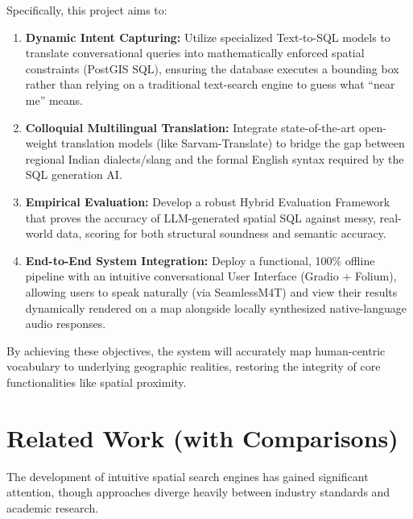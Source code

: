 \documentclass[11pt,a4paper]{article}
\begin{document}
Specifically, this project aims to:
\begin{enumerate}
    \item \textbf{Dynamic Intent Capturing:} Utilize specialized Text-to-SQL models to translate conversational queries into mathematically enforced spatial constraints (PostGIS SQL), ensuring the database executes a bounding box rather than relying on a traditional text-search engine to guess what ``near me'' means.
    \item \textbf{Colloquial Multilingual Translation:} Integrate state-of-the-art open-weight translation models (like Sarvam-Translate) to bridge the gap between regional Indian dialects/slang and the formal English syntax required by the SQL generation AI.
    \item \textbf{Empirical Evaluation:} Develop a robust Hybrid Evaluation Framework that proves the accuracy of LLM-generated spatial SQL against messy, real-world data, scoring for both structural soundness and semantic accuracy.
    \item \textbf{End-to-End System Integration:} Deploy a functional, 100\% offline pipeline with an intuitive conversational User Interface (Gradio + Folium), allowing users to speak naturally (via SeamlessM4T) and view their results dynamically rendered on a map alongside locally synthesized native-language audio responses.
\end{enumerate}

By achieving these objectives, the system will accurately map human-centric vocabulary to underlying geographic realities, restoring the integrity of core functionalities like spatial proximity.

\section{Related Work (with Comparisons)}

The development of intuitive spatial search engines has gained significant attention, though approaches diverge heavily between industry standards and academic research.
\end{document}
